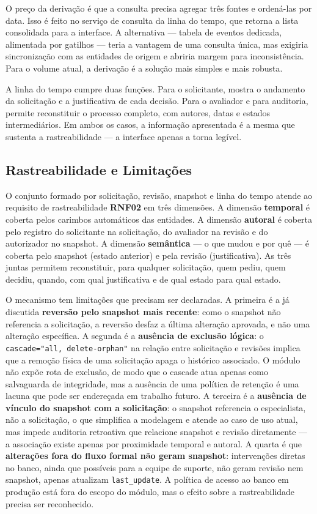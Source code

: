 O preço da derivação é que a consulta precisa agregar três fontes e 
ordená-las por data. Isso é feito no serviço de consulta da linha do 
tempo, que retorna a lista consolidada para a interface. A alternativa 
— tabela de eventos dedicada, alimentada por gatilhos — teria a vantagem 
de uma consulta única, mas exigiria sincronização com as entidades de 
origem e abriria margem para inconsistência. Para o volume atual, a 
derivação é a solução mais simples e mais robusta.

A linha do tempo cumpre duas funções. Para o solicitante, mostra o 
andamento da solicitação e a justificativa de cada decisão. Para o 
avaliador e para auditoria, permite reconstituir o processo completo, 
com autores, datas e estados intermediários. Em ambos os casos, a 
informação apresentada é a mesma que sustenta a rastreabilidade — a 
interface apenas a torna legível.

\subsection{Rastreabilidade e Limitações}
\label{sec:rastreabilidade}

O conjunto formado por solicitação, revisão, snapshot e linha do tempo 
atende ao requisito de rastreabilidade \textbf{RNF02} em três dimensões. A 
dimensão \textbf{temporal} é coberta pelos carimbos automáticos das 
entidades. A dimensão \textbf{autoral} é coberta pelo registro do 
solicitante na solicitação, do avaliador na revisão e do autorizador no 
snapshot. A dimensão \textbf{semântica} — o que mudou e por quê — é 
coberta pelo snapshot (estado anterior) e pela revisão (justificativa). 
As três juntas permitem reconstituir, para qualquer solicitação, quem 
pediu, quem decidiu, quando, com qual justificativa e de qual estado 
para qual estado.

O mecanismo tem limitações que precisam ser declaradas. A primeira é a 
já discutida \textbf{reversão pelo snapshot mais recente}: como o 
snapshot não referencia a solicitação, a reversão desfaz a última 
alteração aprovada, e não uma alteração específica. A segunda é a 
\textbf{ausência de exclusão lógica}: o \texttt{cascade="all, 
delete-orphan"} na relação entre solicitação e revisões implica que a 
remoção física de uma solicitação apaga o histórico associado. O módulo 
não expõe rota de exclusão, de modo que o cascade atua apenas como 
salvaguarda de integridade, mas a ausência de uma política de retenção 
é uma lacuna que pode ser endereçada em trabalho futuro. A terceira é 
a \textbf{ausência de vínculo do snapshot com a solicitação}: o 
snapshot referencia o especialista, não a solicitação, o que simplifica 
a modelagem e atende ao caso de uso atual, mas impede auditoria 
retroativa que relacione snapshot e revisão diretamente — a associação 
existe apenas por proximidade temporal e autoral. A quarta é que 
\textbf{alterações fora do fluxo formal não geram snapshot}: 
intervenções diretas no banco, ainda que possíveis para a equipe de 
suporte, não geram revisão nem snapshot, apenas atualizam 
\texttt{last\_update}. A política de acesso ao banco em produção está 
fora do escopo do módulo, mas o efeito sobre a rastreabilidade precisa 
ser reconhecido.

